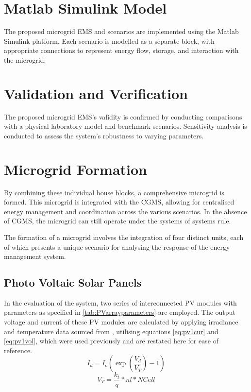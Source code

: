 \section{Matlab Simulink Model}
The proposed microgrid EMS and scenarios are implemented using the Matlab Simulink platform. Each scenario is modelled as a separate block, with appropriate connections to represent energy flow, storage, and interaction with the microgrid.
\section{Validation and Verification}
The proposed microgrid EMS's validity is confirmed by conducting comparisons with a physical laboratory model and benchmark scenarios. Sensitivity analysis is conducted to assess the system's robustness to varying parameters.
\section{Microgrid Formation}
By combining these individual house blocks, a comprehensive microgrid is formed. This microgrid is integrated with the CGMS, allowing for centralised energy management and coordination across the various scenarios. In the absence of CGMS, the microgrid can still operate under the systems of systems rule.\par
The formation of a microgrid involves the integration of four distinct units, each of which presents a unique scenario for analysing the response of the energy management system.
\subsection{Photo Voltaic Solar Panels}
In the evaluation of the system, two series of interconnected PV modules with parameters as specified in \autoref{tab:PVarrayparameters} are employed. The output voltage and current of these PV modules are calculated by applying irradiance and temperature data sourced from \cite{Eskom2020}, utilising equations \autoref{eq:pv1cur} and \autoref{eq:pv1vol}, which were used previously and are restated here for ease of reference.
\begin{equation}
	\label{eq:pv1cur}
	{I_d}={I_o}(\exp(\frac{{V_d}}{{V_T}})-1)
\end{equation}
\begin{equation}
	\label{eq:pv1vol}
	{V_T}=\frac{{k_t}}{{q}}*nl*NCell
\end{equation}

